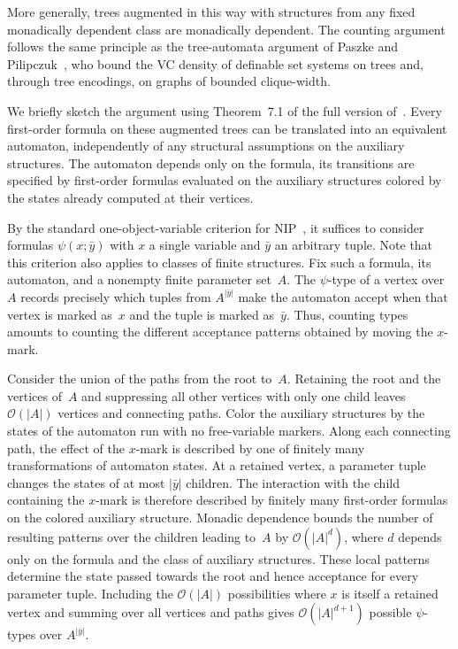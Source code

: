 \documentclass[1p,number,11pt]{elsarticle}
\newcommand{\Oof}{\mathcal{O}}
\theoremstyle{plain}
\begin{document}
More generally, trees augmented in this way with structures from any fixed monadically dependent class are monadically dependent. 
The counting argument follows the same principle as the tree-automata argument of Paszke and Pilipczuk~\cite[Section~3]{paszke2020vc}, who bound the VC density of definable set systems on trees and, through tree encodings, on graphs of bounded clique-width.

We briefly sketch the argument using Theorem~7.1 of the full version of~\cite{pillipczuk2021connectivity}. 
Every first-order formula on these augmented trees can be translated into an equivalent automaton, independently of any structural assumptions on the auxiliary structures. 
The automaton depends only on the formula, its transitions are specified by first-order formulas evaluated on the auxiliary structures colored by the states already computed at their vertices.

By the standard one-object-variable criterion for NIP~\cite{simon2021note}, it suffices to consider formulas $\psi(x;\bar y)$ with $x$ a single variable and $\bar y$ an arbitrary tuple. 
Note that this criterion also applies to classes of finite structures. 
Fix such a formula, its automaton, and a nonempty finite parameter set~$A$. 
The $\psi$-type of a vertex over~$A$ records precisely which tuples from $A^{|\bar y|}$ make the automaton accept when that vertex is marked as~$x$ and the tuple is marked as~$\bar y$. 
Thus, counting types amounts to counting the different acceptance patterns obtained by moving the $x$-mark.

Consider the union of the paths from the root to~$A$. Retaining the root and the vertices of~$A$ and suppressing all other vertices with only one child leaves $\Oof(|A|)$ vertices and connecting paths. 
Color the auxiliary structures by the states of the automaton run with no free-variable markers. 
Along each connecting path, the effect of the $x$-mark is described by one of finitely many transformations of automaton states. 
At a retained vertex, a parameter tuple changes the states of at most $|\bar y|$ children. 
The interaction with the child containing the $x$-mark is therefore described by finitely many first-order formulas on the colored auxiliary structure. 
Monadic dependence bounds the number of resulting patterns over the children leading to~$A$ by $\Oof(|A|^d)$, where $d$ depends only on the formula and the class of auxiliary structures. 
These local patterns determine the state passed towards the root and hence acceptance for every parameter tuple. 
Including the $\Oof(|A|)$ possibilities where $x$ is itself a retained vertex and summing over all vertices and paths gives $\Oof(|A|^{d+1})$ possible $\psi$-types over $A^{|\bar y|}$.
\end{document}
